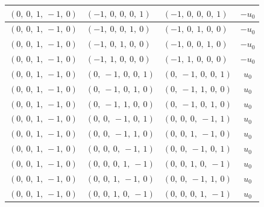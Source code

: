 \documentclass[11pt]{article}
\theoremstyle{definition}
\begin{document}
\begin{longtable}{|l|l|l|c|}
    \hline
    $\left( 0, \  0, \  1, \  -1, \  0\right)$ & $\left( -1, \  0, \  0, \  0, \  1\right)$ & $\left( -1, \  0, \  0, \  0, \  1\right)$ & $- u_{0}$ \\
    \hline
    $\left( 0, \  0, \  1, \  -1, \  0\right)$ & $\left( -1, \  0, \  0, \  1, \  0\right)$ & $\left( -1, \  0, \  1, \  0, \  0\right)$ & $- u_{0}$ \\
    \hline
    $\left( 0, \  0, \  1, \  -1, \  0\right)$ & $\left( -1, \  0, \  1, \  0, \  0\right)$ & $\left( -1, \  0, \  0, \  1, \  0\right)$ & $- u_{0}$ \\
    \hline
    $\left( 0, \  0, \  1, \  -1, \  0\right)$ & $\left( -1, \  1, \  0, \  0, \  0\right)$ & $\left( -1, \  1, \  0, \  0, \  0\right)$ & $- u_{0}$ \\
    \hline
    $\left( 0, \  0, \  1, \  -1, \  0\right)$ & $\left( 0, \  -1, \  0, \  0, \  1\right)$ & $\left( 0, \  -1, \  0, \  0, \  1\right)$ & $u_{0}$ \\
    \hline
    $\left( 0, \  0, \  1, \  -1, \  0\right)$ & $\left( 0, \  -1, \  0, \  1, \  0\right)$ & $\left( 0, \  -1, \  1, \  0, \  0\right)$ & $u_{0}$ \\
    \hline
    $\left( 0, \  0, \  1, \  -1, \  0\right)$ & $\left( 0, \  -1, \  1, \  0, \  0\right)$ & $\left( 0, \  -1, \  0, \  1, \  0\right)$ & $u_{0}$ \\
    \hline
    $\left( 0, \  0, \  1, \  -1, \  0\right)$ & $\left( 0, \  0, \  -1, \  0, \  1\right)$ & $\left( 0, \  0, \  0, \  -1, \  1\right)$ & $u_{0}$ \\
    \hline
    $\left( 0, \  0, \  1, \  -1, \  0\right)$ & $\left( 0, \  0, \  -1, \  1, \  0\right)$ & $\left( 0, \  0, \  1, \  -1, \  0\right)$ & $u_{0}$ \\
    \hline
    $\left( 0, \  0, \  1, \  -1, \  0\right)$ & $\left( 0, \  0, \  0, \  -1, \  1\right)$ & $\left( 0, \  0, \  -1, \  0, \  1\right)$ & $u_{0}$ \\
    \hline
    $\left( 0, \  0, \  1, \  -1, \  0\right)$ & $\left( 0, \  0, \  0, \  1, \  -1\right)$ & $\left( 0, \  0, \  1, \  0, \  -1\right)$ & $u_{0}$ \\
    \hline
    $\left( 0, \  0, \  1, \  -1, \  0\right)$ & $\left( 0, \  0, \  1, \  -1, \  0\right)$ & $\left( 0, \  0, \  -1, \  1, \  0\right)$ & $u_{0}$ \\
    \hline
    $\left( 0, \  0, \  1, \  -1, \  0\right)$ & $\left( 0, \  0, \  1, \  0, \  -1\right)$ & $\left( 0, \  0, \  0, \  1, \  -1\right)$ & $u_{0}$ \\

\end{longtable}
\end{document}
